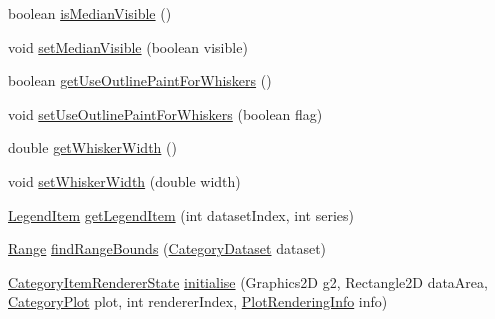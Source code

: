 \begin{DoxyCompactItemize}
\item 
boolean \mbox{\hyperlink{classorg_1_1jfree_1_1chart_1_1renderer_1_1category_1_1_box_and_whisker_renderer_aecf76264232c4debe311bb5083aeb975}{is\+Median\+Visible}} ()
\item 
void \mbox{\hyperlink{classorg_1_1jfree_1_1chart_1_1renderer_1_1category_1_1_box_and_whisker_renderer_a34ea9d397f5039e7fac6658313631b60}{set\+Median\+Visible}} (boolean visible)
\item 
boolean \mbox{\hyperlink{classorg_1_1jfree_1_1chart_1_1renderer_1_1category_1_1_box_and_whisker_renderer_ad023cd5e326f64a23c988db0edc3c8e1}{get\+Use\+Outline\+Paint\+For\+Whiskers}} ()
\item 
void \mbox{\hyperlink{classorg_1_1jfree_1_1chart_1_1renderer_1_1category_1_1_box_and_whisker_renderer_abe54ef6a31401c49285ff4096d192451}{set\+Use\+Outline\+Paint\+For\+Whiskers}} (boolean flag)
\item 
double \mbox{\hyperlink{classorg_1_1jfree_1_1chart_1_1renderer_1_1category_1_1_box_and_whisker_renderer_a78cc4192959c2c432656a3293aa8f3ac}{get\+Whisker\+Width}} ()
\item 
void \mbox{\hyperlink{classorg_1_1jfree_1_1chart_1_1renderer_1_1category_1_1_box_and_whisker_renderer_a43add3f74f7d750c774198f910ad0bc1}{set\+Whisker\+Width}} (double width)
\item 
\mbox{\hyperlink{classorg_1_1jfree_1_1chart_1_1_legend_item}{Legend\+Item}} \mbox{\hyperlink{classorg_1_1jfree_1_1chart_1_1renderer_1_1category_1_1_box_and_whisker_renderer_a4bcc61984760a07622e11a734aa835e3}{get\+Legend\+Item}} (int dataset\+Index, int series)
\item 
\mbox{\hyperlink{classorg_1_1jfree_1_1data_1_1_range}{Range}} \mbox{\hyperlink{classorg_1_1jfree_1_1chart_1_1renderer_1_1category_1_1_box_and_whisker_renderer_a75d2ee53086dc5242430580069ab9370}{find\+Range\+Bounds}} (\mbox{\hyperlink{interfaceorg_1_1jfree_1_1data_1_1category_1_1_category_dataset}{Category\+Dataset}} dataset)
\item 
\mbox{\hyperlink{classorg_1_1jfree_1_1chart_1_1renderer_1_1category_1_1_category_item_renderer_state}{Category\+Item\+Renderer\+State}} \mbox{\hyperlink{classorg_1_1jfree_1_1chart_1_1renderer_1_1category_1_1_box_and_whisker_renderer_a408aa43577d1f5ed5af1685069a8c409}{initialise}} (Graphics2D g2, Rectangle2D data\+Area, \mbox{\hyperlink{classorg_1_1jfree_1_1chart_1_1plot_1_1_category_plot}{Category\+Plot}} plot, int renderer\+Index, \mbox{\hyperlink{classorg_1_1jfree_1_1chart_1_1plot_1_1_plot_rendering_info}{Plot\+Rendering\+Info}} info)

\end{DoxyCompactItemize}
